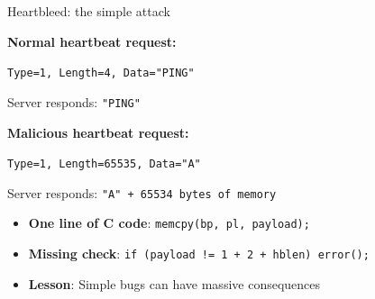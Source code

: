 \ifdefined\PRESENTATION\else\PassOptionsToClass{handout}{beamer}\fi\documentclass[aspectratio=169, lualatex]{beamer}
\begin{document}
\begin{frame}{Heartbleed: the simple attack}
	\begin{center}
		\textbf{Normal heartbeat request:}
	\end{center}
	\begin{center}
		\texttt{Type=1, Length=4, Data="PING"}
	\end{center}
	\begin{center}
		Server responds: \texttt{"PING"}
	\end{center}
	\pause
	\begin{center}
		\textbf{Malicious heartbeat request:}
	\end{center}
	\begin{center}
		\texttt{Type=1, Length=65535, Data="A"}
	\end{center}
	\begin{center}
		Server responds: \texttt{"A" + 65534 bytes of memory}
	\end{center}
	\pause
	\begin{itemize}
		\item \textbf{One line of C code}: \texttt{memcpy(bp, pl, payload);}
		\item \textbf{Missing check}: \texttt{if (payload != 1 + 2 + hblen) error();}
		\item \textbf{Lesson}: Simple bugs can have massive consequences
	\end{itemize}
\end{frame}
\end{document}
